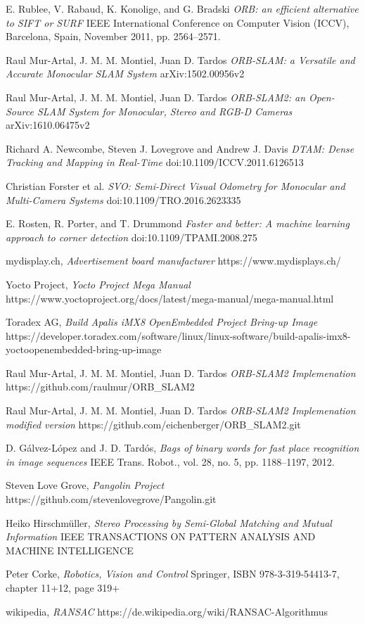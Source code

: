 \documentclass[11pt,a4paper,titlepage,oneside]{report}
\begin{document}
\begin{thebibliography}{1}

	E. Rublee, V. Rabaud, K. Konolige, and G. Bradski
	\textit{ORB: an efficient alternative to SIFT or SURF} 
	IEEE International Conference on Computer Vision (ICCV), Barcelona, Spain, November 2011, pp. 2564–2571.

  Raul Mur-Artal, J. M. M. Montiel, Juan D. Tardos
  \textit{ORB-SLAM: a Versatile and Accurate Monocular SLAM System}
  arXiv:1502.00956v2

  Raul Mur-Artal, J. M. M. Montiel, Juan D. Tardos
  \textit{ORB-SLAM2: an Open-Source SLAM System for Monocular, Stereo and RGB-D Cameras}
	arXiv:1610.06475v2 

	Richard A. Newcombe, Steven J. Lovegrove and Andrew J. Davis
	\textit{DTAM: Dense Tracking and Mapping in Real-Time}
	doi:10.1109/ICCV.2011.6126513

	Christian Forster et al.
	\textit{SVO: Semi-Direct Visual Odometry for Monocular and Multi-Camera Systems}
	doi:10.1109/TRO.2016.2623335

	E. Rosten, R. Porter, and T. Drummond 
	\textit{Faster and better: A machine learning approach to corner detection}
	doi:10.1109/TPAMI.2008.275


	mydisplay.ch,
	\textit{Advertisement board manufacturer}
	https://www.mydisplays.ch/

	Yocto Project,
	\textit{Yocto Project Mega Manual}
	https://www.yoctoproject.org/docs/latest/mega-manual/mega-manual.html

	Toradex AG,
	\textit{Build Apalis iMX8 OpenEmbedded Project Bring-up Image}
	https://developer.toradex.com/software/linux/linux-software/build-apalis-imx8-yoctoopenembedded-bring-up-image

  Raul Mur-Artal, J. M. M. Montiel, Juan D. Tardos
  \textit{ORB-SLAM2 Implemenation}
	https://github.com/raulmur/ORB\_SLAM2

  Raul Mur-Artal, J. M. M. Montiel, Juan D. Tardos
  \textit{ORB-SLAM2 Implemenation modified version}
	https://github.com/eichenberger/ORB\_SLAM2.git

	D. Gálvez-López and J. D. Tardós,
	\textit{Bags of binary words for fast place recognition in image sequences}
	IEEE Trans. Robot., vol. 28, no. 5, pp. 1188–1197, 2012.

	Steven Love Grove,
	\textit{Pangolin Project}
	https://github.com/stevenlovegrove/Pangolin.git

	Heiko Hirschmüller,
	\textit{ Stereo Processing by Semi-Global Matching and Mutual Information}
	IEEE TRANSACTIONS ON PATTERN ANALYSIS AND MACHINE INTELLIGENCE
	 
	Peter Corke,
	\textit{Robotics, Vision and Control}
	Springer, ISBN 978-3-319-54413-7, chapter 11+12, page 319+

	wikipedia,
	\textit{RANSAC}
	https://de.wikipedia.org/wiki/RANSAC-Algorithmus

\end{thebibliography}
\end{document}
